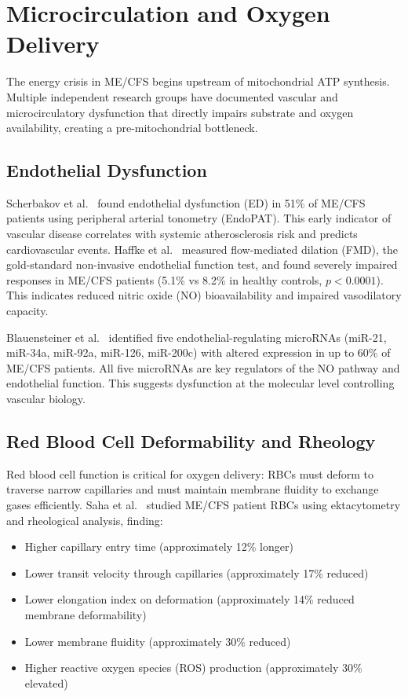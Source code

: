 \section{Microcirculation and Oxygen Delivery}
\label{sec:microcirculation-oxygen}

The energy crisis in ME/CFS begins upstream of mitochondrial ATP synthesis. Multiple independent research groups have documented vascular and microcirculatory dysfunction that directly impairs substrate and oxygen availability, creating a pre-mitochondrial bottleneck.

\subsection{Endothelial Dysfunction}

Scherbakov et al.~\cite{Scherbakov2020} found endothelial dysfunction (ED) in 51\% of ME/CFS patients using peripheral arterial tonometry (EndoPAT). This early indicator of vascular disease correlates with systemic atherosclerosis risk and predicts cardiovascular events. Haffke et al.~\cite{Haffke2023fmd} measured flow-mediated dilation (FMD), the gold-standard non-invasive endothelial function test, and found severely impaired responses in ME/CFS patients (5.1\% vs 8.2\% in healthy controls, $p < 0.0001$). This indicates reduced nitric oxide (NO) bioavailability and impaired vasodilatory capacity.

Blauensteiner et al.~\cite{Blauensteiner2021mirna} identified five endothelial-regulating microRNAs (miR-21, miR-34a, miR-92a, miR-126, miR-200c) with altered expression in up to 60\% of ME/CFS patients. All five microRNAs are key regulators of the NO pathway and endothelial function. This suggests dysfunction at the molecular level controlling vascular biology.

\subsection{Red Blood Cell Deformability and Rheology}

Red blood cell function is critical for oxygen delivery: RBCs must deform to traverse narrow capillaries and must maintain membrane fluidity to exchange gases efficiently. Saha et al.~\cite{Saha2019} studied ME/CFS patient RBCs using ektacytometry and rheological analysis, finding:

\begin{itemize}
    \item Higher capillary entry time (approximately 12\% longer)
    \item Lower transit velocity through capillaries (approximately 17\% reduced)
    \item Lower elongation index on deformation (approximately 14\% reduced membrane deformability)
    \item Lower membrane fluidity (approximately 30\% reduced)
    \item Higher reactive oxygen species (ROS) production (approximately 30\% elevated)
\end{itemize}

